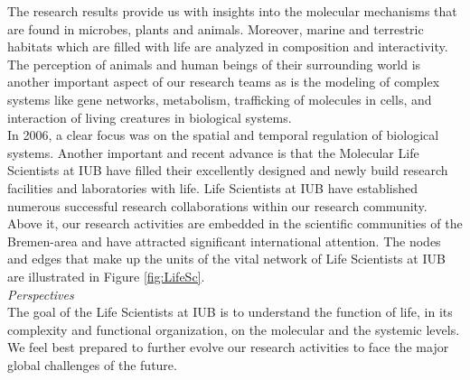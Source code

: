 The research results provide us with insights into the molecular mechanisms that are found in microbes, plants and animals. Moreover, marine and terrestric habitats which are filled with life are analyzed in composition and interactivity. The perception of animals and human beings of their surrounding world is another important aspect of our research teams as is the modeling of complex systems like gene networks, metabolism, trafficking of molecules in cells, and interaction of living creatures in biological systems.\\

In 2006, a clear focus was on the spatial and temporal regulation of biological systems. Another important and recent advance is that the Molecular Life Scientists at IUB have filled their excellently designed and newly build research facilities and laboratories with life. Life Scientists at IUB have established numerous successful research collaborations within our research community. Above it, our research activities are embedded in the scientific communities of the Bremen-area and have attracted significant international attention. The nodes and edges that make up the units of the vital network of Life Scientists at IUB are illustrated in Figure \ref{fig:LifeSc}. \\




\textit{Perspectives}\\
The goal of the Life Scientists at IUB is to understand the function
of life, in its complexity and functional organization, on the
molecular and the systemic levels. We feel best prepared to further
evolve our research activities to face the major global challenges
of the future.
